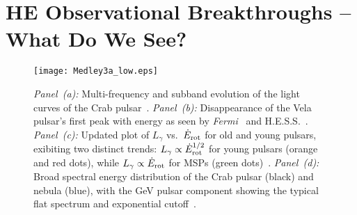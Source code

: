\documentclass{PoS}
\begin{document}
\section{HE Observational Breakthroughs -- What Do We See?}\label{sec:Obs}
\begin{figure}[t]
  \begin{center}
  \texttt{[image: Medley3a\_low.eps]}
  \caption{\textit{Panel~(a):} Multi-frequency and subband evolution of the light curves of the Crab pulsar~\cite{Fermi_Crab}. \textit{Panel~(b):} Disappearance of the Vela pulsar's first peak with energy as seen by \textit{Fermi}~\cite{Vela2} and H.E.S.S.~\cite{DeNaurois15}. \textit{Panel~(c):} Updated plot of $L_\gamma$ vs.\ $\dot{E}_{\rm rot}$ for old and young pulsars, exibiting two distinct trends: $L_\gamma\propto\dot{E}_{\rm rot}^{1/2}$ for young pulsars (orange and red dots), while $L_\gamma\propto\dot{E}_{\rm rot}$ for MSPs (green dots)~\cite{Grenier15}. \textit{Panel~(d):} Broad spectral energy distribution of the Crab pulsar (black) and nebula (blue), with the GeV pulsar component showing the typical flat spectrum and exponential cutoff~\cite{Buehler14}.}
  \label{fig:medley}
  \end{center}
\end{figure}
\end{document}
